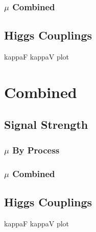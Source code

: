 \subsubsection{$\mu$ Combined}
\subsection{Higgs Couplings}
kappaF kappaV plot

\section{Combined}

\subsection{Signal Strength}
\subsubsection{$\mu$ By Process}
\subsubsection{$\mu$ Combined}
\subsection{Higgs Couplings}
kappaF kappaV plot

